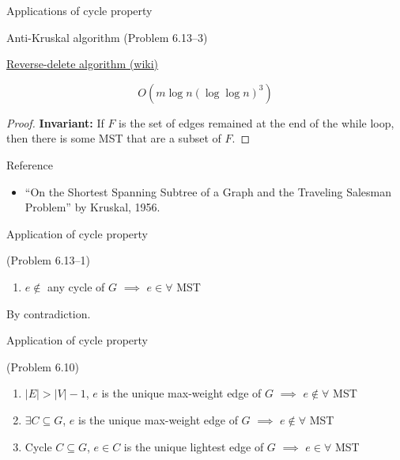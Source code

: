 \begin{frame}{Applications of cycle property}
  \begin{exampleblock}{Anti-Kruskal algorithm (Problem 6.13--3)}
	\centerline{\href{https://en.wikipedia.org/wiki/Reverse-delete_algorithm}{Reverse-delete algorithm (wiki)}}

	\[
	  O(m \log n (\log \log n)^3)
	\]
  \end{exampleblock}

  \begin{proof}
	\textbf{Invariant: } If $F$ is the set of edges remained at the end of the while loop, 
	then there is some MST that are a subset of $F$.
  \end{proof}

  \begin{alertblock}{Reference}
	\begin{itemize}
	  \item ``On the Shortest Spanning Subtree of a Graph and the Traveling Salesman Problem'' by Kruskal, 1956.
	\end{itemize}
  \end{alertblock}
\end{frame}
\begin{frame}{Application of cycle property}
  \begin{exampleblock}{(Problem 6.13--1)}
	\begin{enumerate}[(1)]
	  \item $e \notin$ any cycle of $G$ $\implies$ $e \in \forall$ MST
	\end{enumerate}
  \end{exampleblock}

  \centerline{By contradiction.}
\end{frame}
\begin{frame}{Application of cycle property}
  \begin{exampleblock}{(Problem 6.10)}
	\begin{enumerate}[(1)]
	  \item $|E| > |V| - 1$, $e$ is the unique max-weight edge of $G$ $\implies$ $e \notin \forall$ MST
	  \item $\exists C \subseteq G$, $e$ is the unique max-weight edge of $G$ $\implies$ $e \notin \forall$ MST
	  \setcounter{enumi}{4}
	  \item Cycle $C \subseteq G$, $e \in C$ is the unique lightest edge of $G$ $\implies$ $e \in \forall$ MST
	\end{enumerate}
  \end{exampleblock}
\end{frame}
